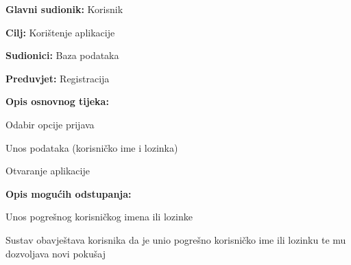 					
					\noindent {}
					\begin{packed_item}
						
						\item \textbf{Glavni sudionik: }Korisnik
						\item  \textbf{Cilj:} Korištenje aplikacije
						\item  \textbf{Sudionici:} Baza podataka
						\item  \textbf{Preduvjet:} Registracija
						\item  \textbf{Opis osnovnog tijeka:}
						
						\item[] \begin{packed_enum}
							
							\item Odabir opcije prijava
							\item Unos podataka (korisničko ime i lozinka)
							\item Otvaranje aplikacije
					
							
						\end{packed_enum}
						
						\item  \textbf{Opis mogućih odstupanja:}
						
						\item[] \begin{packed_item}
							
							\item[2.a] Unos pogrešnog korisničkog imena ili lozinke
							\item[] \begin{packed_enum}
								
								\item Sustav obavještava korisnika da je unio pogrešno korisničko ime ili lozinku te mu dozvoljava novi pokušaj
								
								\end{packed_enum}
							
						\end{packed_item}
						
					\end{packed_item}
					
